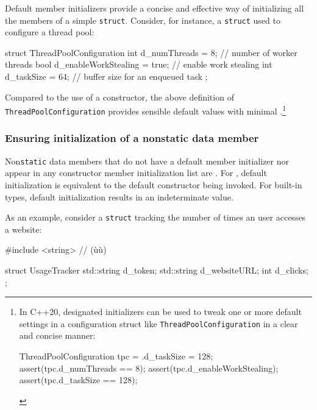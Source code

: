 Default member initializers provide a concise and effective way of
initializing all the members of a simple \lstinline!struct!. Consider, for
instance, a \lstinline!struct! used to configure a thread pool:

\begin{emcppslisting}
struct ThreadPoolConfiguration
{
    int  d_numThreads         = 8;     // number of worker threads
    bool d_enableWorkStealing = true;  // enable work stealing
    int  d_taskSize           = 64;    // buffer size for an enqueued task
};
\end{emcppslisting}
    
\newpage  %
Compared to the use of a constructor, the above definition of
\lstinline!ThreadPoolConfiguration! provides sensible default values with
minimal .{\cprotect\footnote{In C++20, designated
initializers can be used to tweak one or more default settings in a
configuration struct like \lstinline!ThreadPoolConfiguration! in a clear
and concise manner:

\begin{emcppslisting}[style=footcode]
ThreadPoolConfiguration tpc = {.d_taskSize = 128};
assert(tpc.d_numThreads == 8);
assert(tpc.d_enableWorkStealing);
assert(tpc.d_taskSize == 128);
\end{emcppslisting}
      }}

\subsubsection[Ensuring initialization of a non\lstinline!static! data member]{Ensuring initialization of a non{\SubsubsecCode static} data member}\label{ensuring-initialization-of-a-nonstatic-data-member}

Non\lstinline!static! data members that do not have a default member
initializer nor appear in any constructor member initialization list are
. For , default
initialization is equivalent to the default constructor being invoked.
For built-in types, default initialization results in an indeterminate
value.

As an example, consider a \lstinline!struct! tracking the number of times
an user accesses a website:

\begin{emcppslisting}
#include <string>  // (ù{}ù)

struct UsageTracker
{
    std::string d_token;
    std::string d_websiteURL;
    int         d_clicks;
};
\end{emcppslisting}
    

